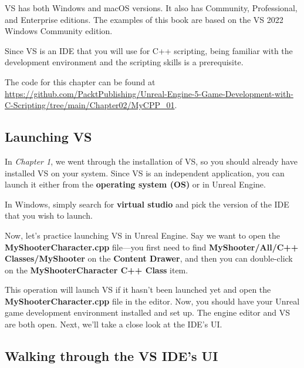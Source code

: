 \documentclass[11pt]{article} %
\begin{document}
VS has both Windows and macOS versions. It also has Community, Professional, and Enterprise editions. The examples of this book are based on the VS 2022 Windows Community edition.

Since VS is an IDE that you will use for C++ scripting, being familiar with the development environment and the scripting skills is a prerequisite.

The code for this chapter can be found at \url{https://github.com/PacktPublishing/Unreal-Engine-5-Game-Development-with-C-Scripting/tree/main/Chapter02/MyCPP\_01}.

\subsection*{Launching VS}

In \textit{Chapter 1}, we went through the installation of VS, so you should already have installed VS on your system. Since VS is an independent application, you can launch it either from the \textbf{operating system (OS)} or in Unreal Engine.

In Windows, simply search for \textbf{virtual studio} and pick the version of the IDE that you wish to launch.

Now, let’s practice launching VS in Unreal Engine. Say we want to open the \textbf{MyShooterCharacter.cpp} file—you first need to find \textbf{MyShooter/All/C++ Classes/MyShooter} on the \textbf{Content Drawer}, and then you can double-click on the \textbf{MyShooterCharacter C++ Class} item.

This operation will launch VS if it hasn’t been launched yet and open the \textbf{MyShooterCharacter.cpp} file in the editor. Now, you should have your Unreal game development environment installed and set up. The engine editor and VS are both open. Next, we’ll take a close look at the IDE’s UI.

\subsection*{Walking through the VS IDE’s UI}
\end{document}
